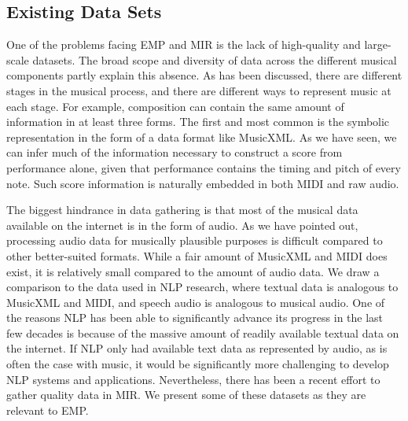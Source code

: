 \subsection{Existing Data Sets}
One of the problems facing EMP and MIR is the lack of high-quality and large-scale datasets\cite{cancino2018computational}. The broad scope and diversity of data across the different musical components partly explain this absence. As has been discussed, there are different stages in the musical process, and there are different ways to represent music at each stage. For example, composition can contain the same amount of information in at least three forms. The first and most common is the symbolic representation in the form of a data format like MusicXML. As we have seen, we can infer much of the information necessary to construct a score from performance alone, given that performance contains the timing and pitch of every note. Such score information is naturally embedded in both MIDI and raw audio. 

The biggest hindrance in data gathering is that most of the musical data available on the internet is in the form of audio. As we have pointed out, processing audio data for musically plausible purposes is difficult compared to other better-suited formats. While a fair amount of MusicXML and MIDI does exist, it is relatively small compared to the amount of audio data. We draw a comparison to the data used in NLP research, where textual data is analogous to MusicXML and MIDI, and speech audio is analogous to musical audio. One of the reasons NLP has been able to significantly advance its progress in the last few decades is because of the massive amount of readily available textual data on the internet. If NLP only had available text data as represented by audio, as is often the case with music, it would be significantly more challenging to develop NLP systems and applications. Nevertheless, there has been a recent effort to gather quality data in MIR. We present some of these datasets as they are relevant to EMP. 

